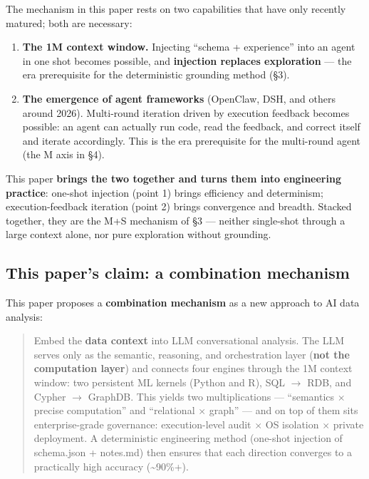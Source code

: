 \documentclass[11pt]{article}
\begin{document}
The mechanism in this paper rests on two capabilities that have only recently matured; both are necessary:

\begin{enumerate}
\def\labelenumi{\arabic{enumi}.}
\item
  \textbf{The 1M context window.} Injecting ``schema + experience'' into an agent in one shot becomes possible, and \textbf{injection replaces exploration} --- the era prerequisite for the deterministic grounding method (\S{}3).
\item
  \textbf{The emergence of agent frameworks} (OpenClaw, DSH, and others around 2026). Multi-round iteration driven by execution feedback becomes possible: an agent can actually run code, read the feedback, and correct itself and iterate accordingly. This is the era prerequisite for the multi-round agent (the M axis in \S{}4).
\end{enumerate}

This paper \textbf{brings the two together and turns them into engineering practice}: one-shot injection (point 1) brings efficiency and determinism; execution-feedback iteration (point 2) brings convergence and breadth. Stacked together, they are the M+S mechanism of \S{}3 --- neither single-shot through a large context alone, nor pure exploration without grounding.

\subsection{This paper's claim: a combination mechanism}

This paper proposes a \textbf{combination mechanism} as a new approach to AI data analysis:

\begin{quote}
Embed the \textbf{data context} into LLM conversational analysis. The LLM serves only as the semantic, reasoning, and orchestration layer (\textbf{not the computation layer}) and connects four engines through the 1M context window: two persistent ML kernels (Python and R), SQL $\rightarrow$ RDB, and Cypher $\rightarrow$ GraphDB. This yields two multiplications --- ``semantics $\times$ precise computation'' and ``relational $\times$ graph'' --- and on top of them sits enterprise-grade governance: execution-level audit $\times$ OS isolation $\times$ private deployment. A deterministic engineering method (one-shot injection of schema.json + notes.md) then ensures that each direction converges to a practically high accuracy (\textasciitilde90\%+).
\end{quote}
\end{document}
